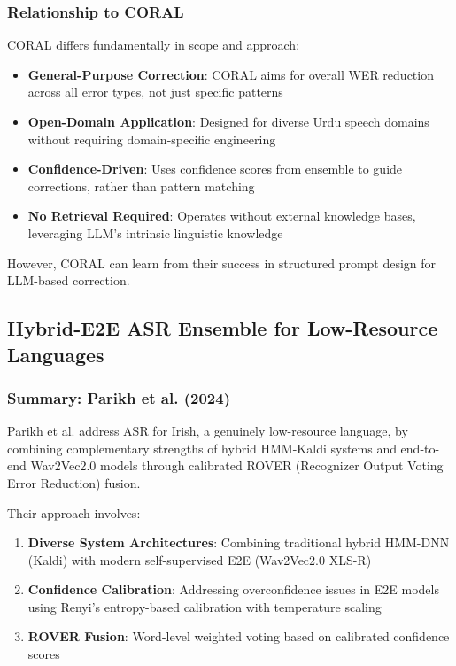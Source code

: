 \subsubsection{Relationship to CORAL}

CORAL differs fundamentally in scope and approach:

\begin{itemize}[topsep=4pt,itemsep=2pt]
    \item \textbf{General-Purpose Correction}: CORAL aims for overall WER reduction across all error types, not just specific patterns
    \item \textbf{Open-Domain Application}: Designed for diverse Urdu speech domains without requiring domain-specific engineering
    \item \textbf{Confidence-Driven}: Uses confidence scores from ensemble to guide corrections, rather than pattern matching
    \item \textbf{No Retrieval Required}: Operates without external knowledge bases, leveraging LLM's intrinsic linguistic knowledge
\end{itemize}

However, CORAL can learn from their success in structured prompt design for LLM-based correction.

\subsection{Hybrid-E2E ASR Ensemble for Low-Resource Languages}

\subsubsection{Summary: Parikh et al. (2024)}

Parikh et al. \cite{parikh2024} address ASR for Irish, a genuinely low-resource language, by combining complementary strengths of hybrid HMM-Kaldi systems and end-to-end Wav2Vec2.0 models through calibrated ROVER (Recognizer Output Voting Error Reduction) fusion.

Their approach involves:

\begin{enumerate}[topsep=6pt,itemsep=3pt]
    \item \textbf{Diverse System Architectures}: Combining traditional hybrid HMM-DNN (Kaldi) with modern self-supervised E2E (Wav2Vec2.0 XLS-R)
    \item \textbf{Confidence Calibration}: Addressing overconfidence issues in E2E models using Renyi's entropy-based calibration with temperature scaling
    \item \textbf{ROVER Fusion}: Word-level weighted voting based on calibrated confidence scores
\end{enumerate}

